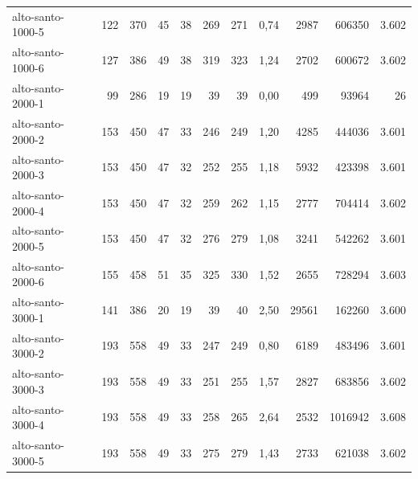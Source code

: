 \begin{table}[ht!]
{\begin{tabular}{lrrrrrrrrrr}
			\rowcolor{rowlight}alto-santo-1000-5                                                   & 122 & 370  & 45  & 38 & 269 & 271 & 0,74  & 2987  & 606350  & 3.602 \\
			\rowcolor{rowlight}alto-santo-1000-6                                                   & 127 & 386  & 49  & 38 & 319 & 323 & 1,24  & 2702  & 600672  & 3.602 \\
			\rowcolor{rowgrey}alto-santo-2000-1                                                    & 99  & 286  & 19  & 19 & 39  & 39  & 0,00  & 499   & 93964   & 26    \\
			\rowcolor{rowlight}alto-santo-2000-2                                                   & 153 & 450  & 47  & 33 & 246 & 249 & 1,20  & 4285  & 444036  & 3.601 \\
			\rowcolor{rowlight}alto-santo-2000-3                                                   & 153 & 450  & 47  & 32 & 252 & 255 & 1,18  & 5932  & 423398  & 3.601 \\
			\rowcolor{rowlight}alto-santo-2000-4                                                   & 153 & 450  & 47  & 32 & 259 & 262 & 1,15  & 2777  & 704414  & 3.602 \\
			\rowcolor{rowlight}alto-santo-2000-5                                                   & 153 & 450  & 47  & 32 & 276 & 279 & 1,08  & 3241  & 542262  & 3.601 \\
			\rowcolor{rowlight}alto-santo-2000-6                                                   & 155 & 458  & 51  & 35 & 325 & 330 & 1,52  & 2655  & 728294  & 3.603 \\
			\rowcolor{rowlight}alto-santo-3000-1                                                   & 141 & 386  & 20  & 19 & 39  & 40  & 2,50  & 29561 & 162260  & 3.600 \\
			\rowcolor{rowlight}alto-santo-3000-2                                                   & 193 & 558  & 49  & 33 & 247 & 249 & 0,80  & 6189  & 483496  & 3.601 \\
			\rowcolor{rowlight}alto-santo-3000-3                                                   & 193 & 558  & 49  & 33 & 251 & 255 & 1,57  & 2827  & 683856  & 3.602 \\
			\rowcolor{rowlight}alto-santo-3000-4                                                   & 193 & 558  & 49  & 33 & 258 & 265 & 2,64  & 2532  & 1016942 & 3.608 \\
			\rowcolor{rowlight}alto-santo-3000-5                                                   & 193 & 558  & 49  & 33 & 275 & 279 & 1,43  & 2733  & 621038  & 3.602 \\

\end{tabular}}
\end{table}
